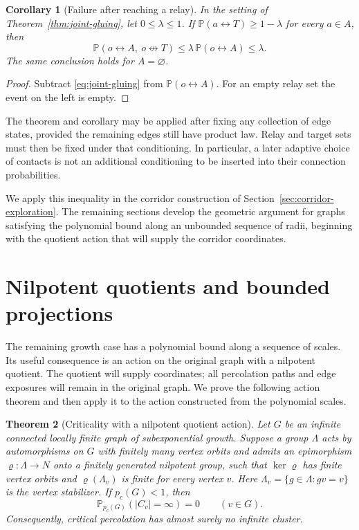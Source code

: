 \documentclass[11pt]{article}
\newtheorem{theorem}{Theorem}[section]
\newtheorem{corollary}[theorem]{Corollary}
\theoremstyle{definition}
\newcommand{\PP}{\mathbb P}
\newcommand{\pc}{p_c}
\begin{document}
\begin{corollary}[Failure after reaching a relay]
\label{cor:gluing-failure}
In the setting of Theorem~\ref{thm:joint-gluing}, let $0\le\lambda\le1$.
If $\mathbb P(a\leftrightarrow T)\ge1-\lambda$ for every $a\in A$, then
\[
 \mathbb P(o\leftrightarrow A,\ o\not\leftrightarrow T)
 \le\lambda\,\mathbb P(o\leftrightarrow A)\le\lambda.
\]
The same conclusion holds for $A=\varnothing$.
\end{corollary}

\begin{proof}
Subtract \eqref{eq:joint-gluing} from $\mathbb P(o\leftrightarrow A)$.
For an empty relay set the event on the left is empty.
\end{proof}

The theorem and corollary may be applied after fixing any collection of
edge states, provided the remaining edges still have product law.
Relay and target sets must then be fixed under that conditioning.
In particular, a later adaptive choice of contacts is not an additional
conditioning to be inserted into their connection probabilities.

We apply this inequality in the corridor construction of
Section~\ref{sec:corridor-exploration}. The remaining sections develop
the geometric argument for graphs satisfying the polynomial bound along
an unbounded sequence of radii, beginning with the quotient action that
will supply the corridor coordinates.

\section{Nilpotent quotients and bounded projections}
\label{sec:structure}

The remaining growth case has a polynomial bound along a sequence of
scales. Its useful consequence is an action on the original graph with
a nilpotent quotient. The quotient will supply coordinates; all
percolation paths and edge exposures will remain in the original graph.
We prove the following action theorem and then apply it to the action
constructed from the polynomial scales.

\begin{theorem}[Criticality with a nilpotent quotient action]
\label{thm:structured}
Let $G$ be an infinite connected locally finite graph of subexponential
growth. Suppose a group $\Lambda$ acts by automorphisms on $G$ with
finitely many vertex orbits and admits an epimorphism $\varrho:\Lambda\to N$ onto a
finitely generated nilpotent group, such that $\ker\varrho$ has finite
vertex orbits and $\varrho(\Lambda_v)$ is finite for every vertex $v$.
Here $\Lambda_v=\{g\in\Lambda:gv=v\}$ is the vertex stabilizer.
If $\pc(G)<1$, then
\[
 \PP_{\pc(G)}(|C_v|=\infty)=0\qquad(v\in G).
\]
Consequently, critical percolation has almost surely no infinite cluster.
\end{theorem}
\end{document}
